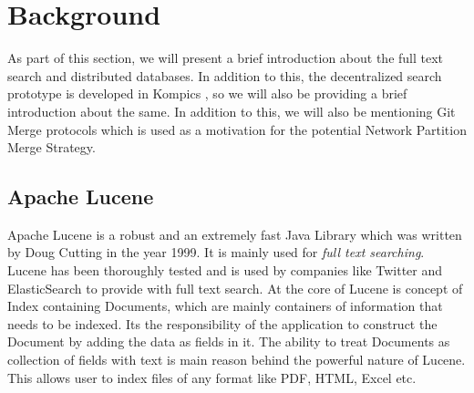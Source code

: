 \documentclass[12pt,a4paper,twoside,openright]{book}
\begin{document}
\chapter{Background}
\label{chap:background}

As part of this section, we will present a brief introduction about the full text search and distributed databases. In addition to this, the decentralized search prototype is developed in Kompics \cite{kompics}, so we will also be providing a brief introduction about the same. In addition to this, we will also be mentioning Git Merge protocols which is used as a motivation for the potential Network Partition Merge Strategy.


\section{Apache Lucene}

Apache Lucene \cite{lucene} is a robust and an extremely fast Java Library which was written by Doug Cutting in the year 1999. It is mainly used for \textit{full text searching}. Lucene has been thoroughly tested and is used by companies like Twitter and ElasticSearch\cite{elasticsearch} to provide with full text search. At the core of Lucene is concept of Index containing Documents, which are mainly containers of information that needs to be indexed. Its the responsibility of the application to construct the Document by adding the data as fields in it. The ability to treat Documents as collection of fields with text is main reason behind the powerful nature of Lucene. This allows user to index files of any format like PDF, HTML, Excel etc. 
\end{document}
